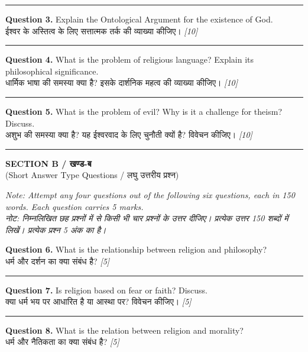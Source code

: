 \documentclass[11pt,a4paper]{article}
\newcommand{\pts}[1]{\hfill \textit{[#1]}}
\begin{document}
\medskip\rule{\linewidth}{0.2pt}\medskip

\noindent \textbf{Question 3.} Explain the Ontological Argument for the existence of God.\\[1pt]
ईश्वर के अस्तित्व के लिए सत्तात्मक तर्क की व्याख्या कीजिए। \pts{10}

\medskip\rule{\linewidth}{0.2pt}\medskip

\noindent \textbf{Question 4.} What is the problem of religious language? Explain its philosophical significance.\\[1pt]
धार्मिक भाषा की समस्या क्या है? इसके दार्शनिक महत्व की व्याख्या कीजिए। \pts{10}

\medskip\rule{\linewidth}{0.2pt}\medskip

\noindent \textbf{Question 5.} What is the problem of evil? Why is it a challenge for theism? Discuss.\\[1pt]
अशुभ की समस्या क्या है? यह ईश्वरवाद के लिए चुनौती क्यों है? विवेचन कीजिए। \pts{10}

\bigskip
\rule{\linewidth}{0.2pt}
\bigskip

\begin{center}
  {\large\bfseries SECTION B / खण्ड-ब}\\[2pt]
  {\normalsize (Short Answer Type Questions / लघु उत्तरीय प्रश्न)}
\end{center}

\noindent \textit{Note: Attempt any four questions out of the following six questions, each in 150 words. Each question carries 5 marks.}\\[2pt]
\noindent \textit{नोट: निम्नलिखित छह प्रश्नों में से किसी भी चार प्रश्नों के उत्तर दीजिए। प्रत्येक उत्तर 150 शब्दों में लिखें। प्रत्येक प्रश्न 5 अंक का है।}

\bigskip

\noindent \textbf{Question 6.} What is the relationship between religion and philosophy?\\[1pt]
धर्म और दर्शन का क्या संबंध है? \pts{5}

\medskip\rule{\linewidth}{0.2pt}\medskip

\noindent \textbf{Question 7.} Is religion based on fear or faith? Discuss.\\[1pt]
क्या धर्म भय पर आधारित है या आस्था पर? विवेचन कीजिए। \pts{5}

\medskip\rule{\linewidth}{0.2pt}\medskip

\noindent \textbf{Question 8.} What is the relation between religion and morality?\\[1pt]
धर्म और नैतिकता का क्या संबंध है? \pts{5}
\end{document}
